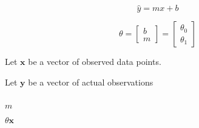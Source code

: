 \documentclass{letter}
\begin{document}


\huge

\begin{equation}
\hat{y} = mx + b
\end{equation}

\begin{equation}
\theta = 
	\left[
		\begin{array}{c}
			b \\ 
			m 
		\end{array}
	\right] =
	\left[
		\begin{array}{c}
			\theta_0 \\ 
			\theta_1 
		\end{array}
	\right]
\end{equation}


Let $\bm{x}$ be a vector of observed data points.

Let $\bm{y}$ be a vector of actual observations 

\begin{equation}

\end{equation}

$m $

$\theta \bm{x}$
\end{document}
